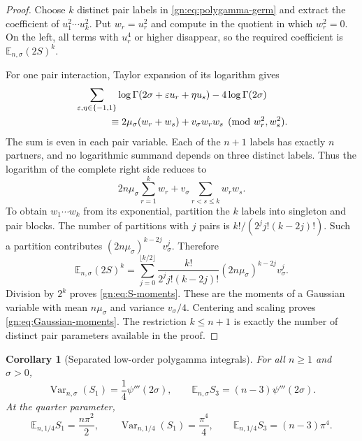 \documentclass[11pt,a4paper]{article}
\numberwithin{equation}{section}
\newtheorem{corollary}[theorem]{Corollary}
\theoremstyle{definition}
\theoremstyle{remark}
\begin{document}
\begin{proof}
Choose $k$ distinct pair labels in \eqref{gn:eq:polygamma-germ} and
extract the coefficient of $u_1^2\cdots u_k^2$.  Put $w_r=u_r^2$ and
compute in the quotient in which $w_r^2=0$.  On the left, all terms
with $u_r^4$ or higher disappear, so the required coefficient is
$\mathbb E_{n,\sigma}(2S)^k$.

For one pair interaction, Taylor expansion of its logarithm gives
\begin{align*}
 &\sum_{\varepsilon,\eta\in\{-1,1\}}
      \log\Gamma(2\sigma+\varepsilon u_r+\eta u_s)
                       -4\log\Gamma(2\sigma)\\
 &\hspace{12mm}\equiv
          2\mu_\sigma(w_r+w_s)+v_\sigma w_rw_s
                              \pmod{w_r^2,w_s^2}.
\end{align*}
The sum is even in each pair variable.  Each of the $n+1$ labels has
exactly $n$ partners, and no logarithmic summand depends on three
distinct labels.  Thus the logarithm of the complete right side reduces
to
\[
       2n\mu_\sigma\sum_{r=1}^kw_r
                  +v_\sigma\sum_{r<s\le k}w_rw_s.
\]
To obtain $w_1\cdots w_k$ from its exponential, partition the $k$
labels into singleton and pair blocks.  The number of partitions with
$j$ pairs is $k!/(2^jj!(k-2j)!)$.  Such a partition contributes
$(2n\mu_\sigma)^{k-2j}v_\sigma^j$.  Therefore
\[
 \mathbb E_{n,\sigma}(2S)^k
 =\sum_{j=0}^{\lfloor k/2\rfloor}
   \frac{k!}{2^jj!(k-2j)!}
       (2n\mu_\sigma)^{k-2j}v_\sigma^j.
\]
Division by $2^k$ proves \eqref{gn:eq:S-moments}.  These are the
moments of a Gaussian variable with mean $n\mu_\sigma$ and variance
$v_\sigma/4$.  Centering and scaling proves
\eqref{gn:eq:Gaussian-moments}.  The restriction $k\le n+1$ is exactly
the number of distinct pair parameters available in the proof.
\end{proof}

\begin{corollary}[Separated low-order polygamma integrals]
\label{gn:cor:variance}
For all $n\ge1$ and $\sigma>0$,
\begin{equation}\label{gn:eq:variance}
 \operatorname{Var}_{n,\sigma}(S_1)=\frac14\psi'''(2\sigma),
 \qquad
 \mathbb E_{n,\sigma}S_3=(n-3)\psi'''(2\sigma).
\end{equation}
At the quarter parameter,
\begin{equation}\label{gn:eq:quarter-statistics}
 \mathbb E_{n,1/4}S_1=\frac{n\pi^2}{2},\qquad
 \operatorname{Var}_{n,1/4}(S_1)=\frac{\pi^4}{4},\qquad
 \mathbb E_{n,1/4}S_3=(n-3)\pi^4.
\end{equation}
\end{corollary}
\end{document}
